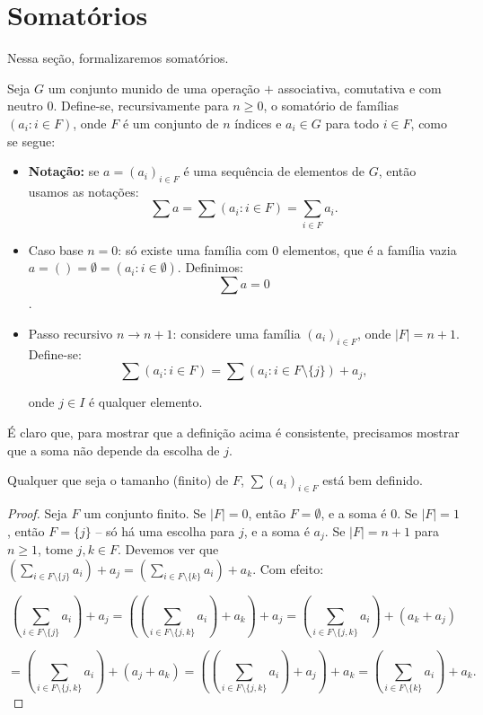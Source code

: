 \section{Somatórios}

Nessa seção, formalizaremos somatórios.

\begin{definition}
Seja $G$ um conjunto munido de uma operação $+$ associativa, comutativa e com neutro $0$. Define-se, recursivamente para $n\geq 0$, o somatório de famílias $(a_i: i \in F)$, onde $F$ é um conjunto de $n$ índices e $a_i \in G$ para todo $i \in F$, como se segue:

\begin{itemize}
\item \textbf{Notação:} se $a=(a_i)_{i\in F}$ é uma sequência de elementos de $G$, então usamos as notações:
$$\sum a=\sum(a_i: i\in F)=\sum_{i\in F} a_i.$$
\item Caso base $n=0$: só existe uma família com $0$ elementos, que é a família vazia $a=()=\emptyset=(a_i:i\in \emptyset)$. Definimos: $$\sum a=0$$.
\item Passo recursivo $n\rightarrow n+1$: considere uma família $(a_i)_{i\in F}$, onde $|F|=n+1$. Define-se:
$$\sum(a_i: i \in F)=\sum(a_i: i \in F\setminus\{j\})+a_j,$$

onde $j \in I$ é qualquer elemento.
\end{itemize}
\end{definition}
É claro que, para mostrar que a definição acima é consistente, precisamos mostrar que a soma não depende da escolha de $j$.

\begin{lemma}
Qualquer que seja o tamanho (finito) de $F$, $\sum(a_i)_{i\in F}$ está bem definido.
\end{lemma}

\begin{proof}
    Seja $F$ um conjunto finito. Se $|F|=0$, então $F=\emptyset$, e a soma é $0$. Se $|F|=1$, então $F=\{j\}$ -- só há uma escolha para $j$, e a soma é $a_j$. Se $|F|=n+1$ para $n\geq 1$, tome $j, k \in F$. Devemos ver que $\left(\sum_{i\in F\setminus\{j\}} a_i\right)+a_j=\left(\sum_{i\in F\setminus\{k\}} a_i\right)+a_k$. Com efeito:

    $$\left(\sum_{i\in F\setminus\{j\}} a_i\right)+a_j=\left(\left(\sum_{i\in F\setminus\{j, k\}} a_i\right)+a_k\right)+a_j=\left(\sum_{i\in F\setminus\{j, k\}} a_i\right)+(a_k+a_j)$$

        $$=\left(\sum_{i\in F\setminus\{j, k\}} a_i\right)+(a_j+a_k)=\left(\left(\sum_{i\in F\setminus\{j, k\}} a_i\right)+a_j\right)+a_k=\left(\sum_{i\in F\setminus\{k\}} a_i\right)+a_k.$$
\end{proof}

